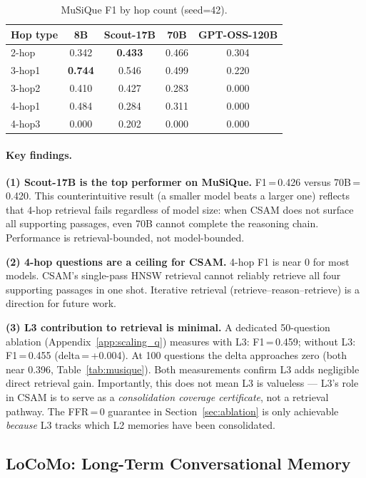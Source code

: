 \documentclass{article}
\begin{document}
\begin{table}[h]
\centering
\caption{MuSiQue F1 by hop count (seed=42).}
\label{tab:musique_hops}
\begin{tabular}{lcccc}
\toprule
Hop type & 8B & Scout-17B & 70B & GPT-OSS-120B \\
\midrule
2-hop  & 0.342 & \textbf{0.433} & 0.466 & 0.304 \\
3-hop1 & \textbf{0.744} & 0.546 & 0.499 & 0.220 \\
3-hop2 & 0.410 & 0.427 & 0.283 & 0.000 \\
4-hop1 & 0.484 & 0.284 & 0.311 & 0.000 \\
4-hop3 & 0.000 & 0.202 & 0.000 & 0.000 \\
\bottomrule
\end{tabular}
\end{table}

\paragraph{Key findings.}
\textbf{(1) Scout-17B is the top performer on MuSiQue.}  F1\,=\,0.426 versus
70B\,=\,0.420.  This counterintuitive result (a smaller model beats a larger
one) reflects that 4-hop retrieval fails regardless of model size: when CSAM
does not surface all supporting passages, even 70B cannot complete the
reasoning chain.  Performance is retrieval-bounded, not model-bounded.

\textbf{(2) 4-hop questions are a ceiling for CSAM.}  4-hop F1 is near 0 for most
models.  CSAM's single-pass HNSW retrieval cannot reliably retrieve all
four supporting passages in one shot.  Iterative retrieval (retrieve–reason–retrieve)
is a direction for future work.

\textbf{(3) L3 contribution to retrieval is minimal.}  A dedicated
50-question ablation (Appendix~\ref{app:scaling_q}) measures with L3:
F1\,=\,0.459; without L3: F1\,=\,0.455 (delta\,=\,+0.004).  At 100
questions the delta approaches zero (both near 0.396, Table~\ref{tab:musique}).
Both measurements confirm L3 adds negligible direct retrieval gain.
Importantly, this does not mean L3 is valueless — L3's role in CSAM is to
serve as a \emph{consolidation coverage certificate}, not a retrieval pathway.
The FFR\,=\,0 guarantee in Section~\ref{sec:ablation} is only achievable
\emph{because} L3 tracks which L2 memories have been consolidated.

\subsection{LoCoMo: Long-Term Conversational Memory}
\label{sec:locomo}
\end{document}
